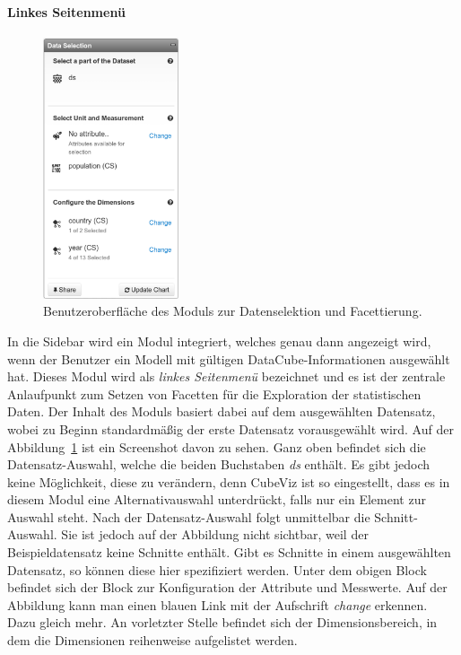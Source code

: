 \documentclass[11pt]{article}
\newcommand{\com}[1]{\marginpar{\em {\small{#1}}}} %
\begin{document}
%
%
\paragraph{Linkes Seitenmenü}

%
%
\begin{figure}[h!]
    \centering
    \includegraphics[width=4cm]{CubeViz/LeftSidebar.pdf}
    \caption{Benutzeroberfläche des Moduls zur Datenselektion und Facettierung.}
    \label{fig:CubeViz_LeftSidebar}
\end{figure}

In die Sidebar wird ein Modul integriert, welches genau dann angezeigt wird, wenn der Benutzer ein Modell mit gültigen DataCube-Informationen ausgewählt hat. Dieses Modul wird als \emph{linkes Seitenmenü}\com{Linkes \\Seitenmenü} bezeichnet und es ist der zentrale Anlaufpunkt zum Setzen von Facetten für die Exploration der statistischen Daten. Der Inhalt des Moduls basiert dabei auf dem ausgewählten Datensatz, wobei zu Beginn standardmäßig der erste Datensatz vorausgewählt wird. Auf der \mbox{Abbildung \ref{fig:CubeViz_LeftSidebar}} ist ein Screenshot davon zu sehen. Ganz oben befindet sich die Datensatz-Auswahl, welche die beiden Buchstaben \emph{ds} enthält. Es gibt jedoch keine Möglichkeit, diese zu verändern, denn CubeViz ist so eingestellt, dass es in diesem Modul eine Alternativauswahl unterdrückt, falls nur ein Element zur Auswahl steht. Nach der Datensatz-Auswahl folgt unmittelbar die Schnitt-Auswahl. Sie ist jedoch auf der Abbildung nicht sichtbar, weil der Beispieldatensatz keine Schnitte enthält. Gibt es Schnitte in einem ausgewählten Datensatz, so können diese hier spezifiziert werden. Unter dem obigen Block befindet sich der Block zur Konfiguration der Attribute und Messwerte. Auf der Abbildung kann man einen blauen Link mit der Aufschrift \emph{change} erkennen. Dazu gleich mehr. An vorletzter Stelle befindet sich der Dimensionsbereich, in dem die Dimensionen reihenweise aufgelistet werden. 
\end{document}
